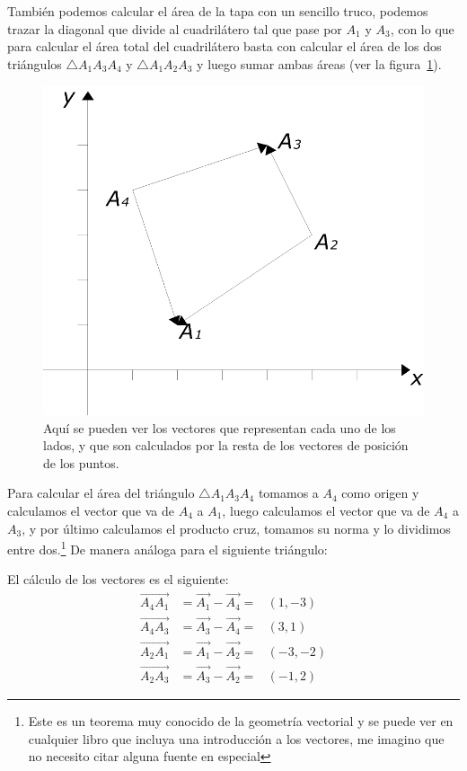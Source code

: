 También podemos calcular el área de la tapa con un sencillo truco, podemos trazar la diagonal que divide al cuadrilátero tal que pase por $A_1$ y $A_3$, con lo que para calcular el área total del cuadrilátero basta con calcular el área de los dos triángulos $\bigtriangleup A_1 A_3 A_4$ y $\bigtriangleup A_1 A_2 A_3$ y luego sumar ambas áreas (ver la figura~\ref{vectorArista:fig}).

\begin{figure}
 \centering
 \includegraphics[]{Img/vectores_cuerpo}
 \caption[Cálculo del área de un caudrilátero]{ 
Aquí se pueden ver los vectores que representan cada uno de los lados, y que son calculados por la resta de los vectores de posición de los puntos.
 } \label{vectorArista:fig}
\end{figure}

Para calcular el área del triángulo $\bigtriangleup A_1 A_3 A_4$ tomamos a $A_4$ como origen y calculamos el vector que va de $A_4$ a $A_1$, luego calculamos el vector que va de $A_4$ a $A_3$, y por último calculamos el producto cruz, tomamos su norma y lo dividimos entre dos.\footnote{Este es un teorema muy conocido de la geometría vectorial y se puede ver en cualquier libro que incluya una introducción a los vectores, me imagino que no necesito citar alguna fuente en especial} De manera análoga para el siguiente triángulo:

El cálculo de los vectores es el siguiente:
\begin{eqnarray}
\overrightarrow{A_4 A_1} & = \vec{A_1} - \vec{A_4} = & (1, -3) \nonumber \\
\overrightarrow{A_4 A_3} & = \vec{A_3} - \vec{A_4} = & (3, 1) \nonumber \\
\overrightarrow{A_2 A_1} & = \vec{A_1} - \vec{A_2} = & (-3, -2) \nonumber \\
\overrightarrow{A_2 A_3} & = \vec{A_3} - \vec{A_2} = & (-1, 2) \nonumber
\end{eqnarray}

